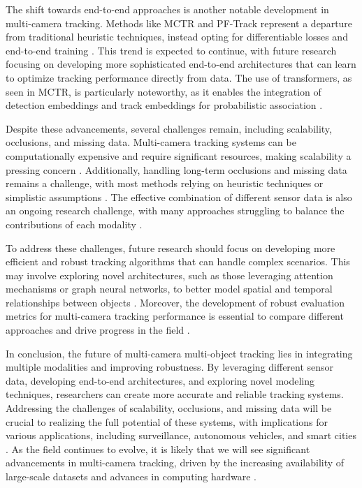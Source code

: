 \documentclass[conference]{IEEEtran}
\begin{document}
The shift towards end-to-end approaches is another notable development in multi-camera tracking. Methods like MCTR and PF-Track represent a departure from traditional heuristic techniques, instead opting for differentiable losses and end-to-end training \cite{MCTR, PF-Track}. This trend is expected to continue, with future research focusing on developing more sophisticated end-to-end architectures that can learn to optimize tracking performance directly from data. The use of transformers, as seen in MCTR, is particularly noteworthy, as it enables the integration of detection embeddings and track embeddings for probabilistic association \cite{MCTR}.

Despite these advancements, several challenges remain, including scalability, occlusions, and missing data. Multi-camera tracking systems can be computationally expensive and require significant resources, making scalability a pressing concern \cite{Scalability}. Additionally, handling long-term occlusions and missing data remains a challenge, with most methods relying on heuristic techniques or simplistic assumptions \cite{Occlusions}. The effective combination of different sensor data is also an ongoing research challenge, with many approaches struggling to balance the contributions of each modality \cite{ModalitiesIntegration}.

To address these challenges, future research should focus on developing more efficient and robust tracking algorithms that can handle complex scenarios. This may involve exploring novel architectures, such as those leveraging attention mechanisms or graph neural networks, to better model spatial and temporal relationships between objects \cite{AttentionMechanisms, GraphNeuralNetworks}. Moreover, the development of robust evaluation metrics for multi-camera tracking performance is essential to compare different approaches and drive progress in the field \cite{EvaluationMetrics}.

In conclusion, the future of multi-camera multi-object tracking lies in integrating multiple modalities and improving robustness. By leveraging different sensor data, developing end-to-end architectures, and exploring novel modeling techniques, researchers can create more accurate and reliable tracking systems. Addressing the challenges of scalability, occlusions, and missing data will be crucial to realizing the full potential of these systems, with implications for various applications, including surveillance, autonomous vehicles, and smart cities \cite{Surveillance, AutonomousVehicles, SmartCities}. As the field continues to evolve, it is likely that we will see significant advancements in multi-camera tracking, driven by the increasing availability of large-scale datasets and advances in computing hardware \cite{LargeScaleDatasets, ComputingHardware}.
\end{document}
